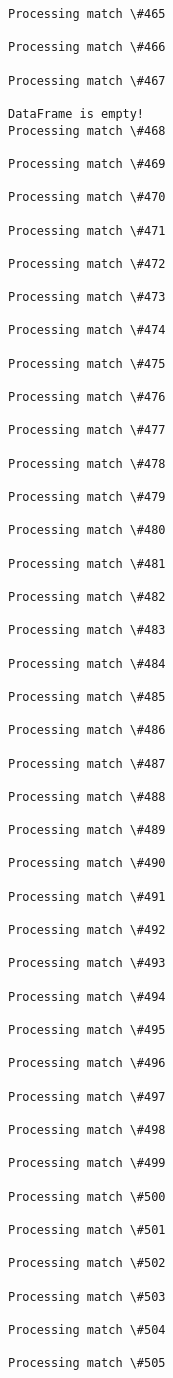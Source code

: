\documentclass[11pt]{article}
\begin{document}
\begin{Verbatim}[commandchars=\\\{\}]
Processing match \#465

Processing match \#466

Processing match \#467

DataFrame is empty!
Processing match \#468

Processing match \#469

Processing match \#470

Processing match \#471

Processing match \#472

Processing match \#473

Processing match \#474

Processing match \#475

Processing match \#476

Processing match \#477

Processing match \#478

Processing match \#479

Processing match \#480

Processing match \#481

Processing match \#482

Processing match \#483

Processing match \#484

Processing match \#485

Processing match \#486

Processing match \#487

Processing match \#488

Processing match \#489

Processing match \#490

Processing match \#491

Processing match \#492

Processing match \#493

Processing match \#494

Processing match \#495

Processing match \#496

Processing match \#497

Processing match \#498

Processing match \#499

Processing match \#500

Processing match \#501

Processing match \#502

Processing match \#503

Processing match \#504

Processing match \#505


\end{Verbatim}
\end{document}
